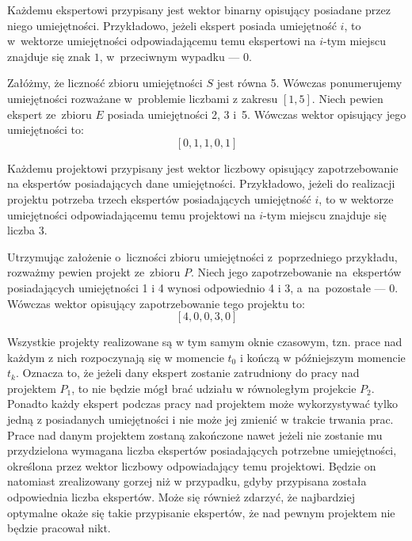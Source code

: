 \documentclass[12pt,a4paper]{article}
\theoremstyle{definition}
\begin{document}
\noindent
Każdemu ekspertowi przypisany jest wektor binarny opisujący posiadane przez niego umiejętności. Przykładowo, jeżeli ekspert posiada umiejętność $i$, to w~wektorze umiejętności odpowiadającemu temu ekspertowi na $i$-tym miejscu znajduje się znak $1$, w~przeciwnym wypadku --- $0$.\\

\begin{tcolorbox}[title=Przykład --- wektory ekspertów]
Załóżmy, że liczność zbioru umiejętności $S$ jest równa 5. Wówczas ponumerujemy umiejętności rozważane w~problemie liczbami z zakresu $[1, 5]$. Niech pewien ekspert ze~zbioru $E$ posiada umiejętności 2, 3 i~5. Wówczas wektor opisujący jego umiejętności to:
$$[0, 1, 1, 0, 1]$$
\end{tcolorbox}

\vspace{0.5em}
\noindent
Każdemu projektowi przypisany jest wektor liczbowy opisujący zapotrzebowanie na ekspertów posiadających dane umiejętności. Przykładowo, jeżeli do realizacji projektu potrzeba trzech ekspertów posiadających umiejętność $i$, to w wektorze umiejętności odpowiadającemu temu projektowi na $i$-tym miejscu znajduje się liczba $3$.\\

\begin{tcolorbox}[title=Przykład --- wektory zapotrzebowania projektów]
Utrzymując założenie o~liczności zbioru umiejętności z~poprzedniego przykładu, rozważmy pewien projekt ze~zbioru $P$. Niech jego zapotrzebowanie na~ekspertów posiadających umiejętności 1 i 4 wynosi odpowiednio 4 i 3, a~na~pozostałe --- 0. Wówczas wektor opisujący zapotrzebowanie tego projektu to:
$$[4, 0, 0, 3, 0]$$
\end{tcolorbox}

\vspace{0.5em}
\noindent
Wszystkie projekty realizowane są w tym samym oknie czasowym, tzn. prace nad każdym z nich rozpoczynają się w momencie $t_0$ i kończą w późniejszym momencie $t_k$. Oznacza to, że jeżeli dany ekspert zostanie zatrudniony do pracy nad projektem $P_1$, to nie będzie mógł brać udziału w równoległym projekcie $P_2$. Ponadto każdy ekspert podczas pracy nad projektem może wykorzystywać tylko jedną z posiadanych umiejętności i nie może jej zmienić w trakcie trwania prac.\\

\noindent
Prace nad danym projektem zostaną zakończone nawet jeżeli nie zostanie mu przydzielona wymagana liczba ekspertów posiadających potrzebne umiejętności, określona przez wektor liczbowy odpowiadający temu projektowi. Będzie on natomiast zrealizowany gorzej niż w przypadku, gdyby przypisana została odpowiednia liczba ekspertów. Może się również zdarzyć, że najbardziej optymalne okaże się takie przypisanie ekspertów, że nad pewnym projektem nie będzie pracował nikt.\\
\end{document}
